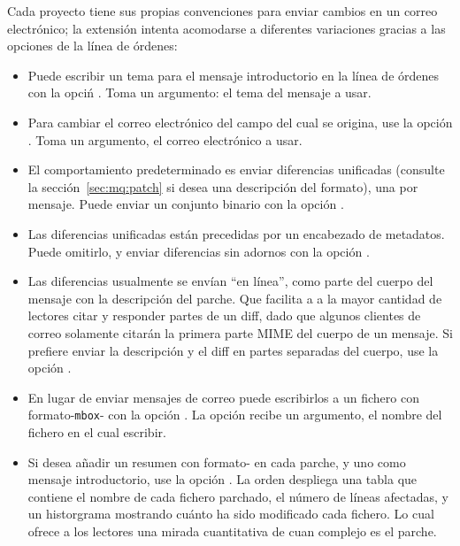 Cada proyecto tiene sus propias convenciones para enviar cambios en un
correo electrónico; la extensión  intenta acomodarse
a diferentes variaciones gracias a las opciones de la línea de órdenes:
\begin{itemize}
\item Puede escribir un tema para el mensaje introductorio en la línea
  de órdenes con la opciń .  Toma un
  argumento: el tema del mensaje a usar.
\item Para cambiar el correo electrónico del campo del cual se
  origina, use la opción .  Toma un
  argumento, el correo electrónico a usar.
\item El comportamiento predeterminado es enviar diferencias
  unificadas (consulte la sección~\ref{sec:mq:patch} si desea una
  descripción del formato), una por mensaje.  Puede enviar un conjunto
  binario con la opción .
\item Las diferencias unificadas están precedidas por un encabezado de
  metadatos.  Puede omitirlo, y enviar diferencias sin adornos con la
  opción .
\item Las diferencias usualmente se envían ``en línea'', como parte
  del cuerpo del mensaje con la descripción del parche.  Que facilita a
  a la mayor cantidad de lectores citar y responder partes de un diff,
  dado que algunos clientes de correo solamente citarán la primera
  parte MIME del cuerpo de un mensaje.  Si prefiere enviar la
  descripción y el diff en partes separadas del cuerpo, use la opción
  .
\item En lugar de enviar mensajes de correo puede escribirlos a un
  fichero con formato-\texttt{mbox}- con la opción
  .  La opción recibe un argumento, el
  nombre del fichero en el cual escribir.
\item Si desea añadir un resumen con formato- en
  cada parche, y uno como mensaje introductorio, use la opción
  .  La orden 
  despliega una tabla que contiene el nombre de cada fichero parchado,
  el número de líneas afectadas, y un historgrama mostrando cuánto ha
  sido modificado cada fichero.  Lo cual ofrece a los lectores una
  mirada cuantitativa de cuan complejo es el parche.
\end{itemize}

